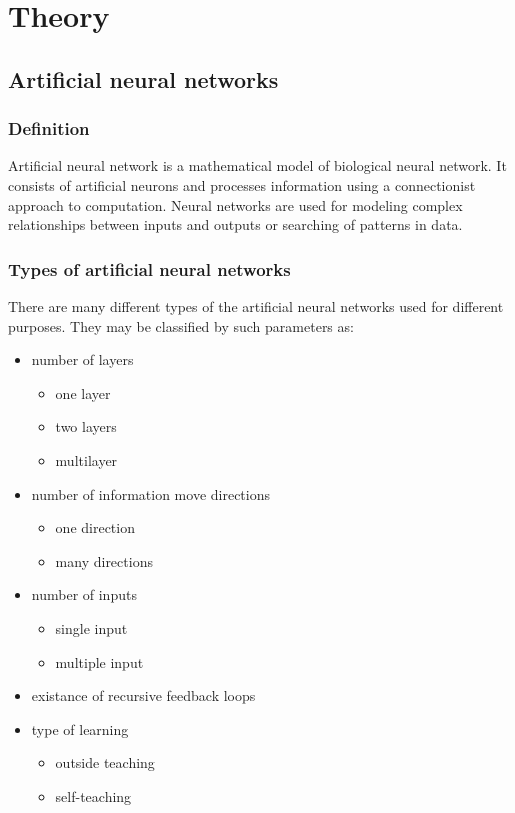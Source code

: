 \documentclass[a4paper,12pt]{article}
\begin{document}
\section{Theory}
\subsection{Artificial neural networks}
\subsubsection{Definition}

Artificial neural network is a mathematical model of biological neural network. It consists of artificial neurons and processes information using a connectionist approach to computation. Neural networks are used for modeling complex relationships between inputs and outputs or searching of patterns in data.

\subsubsection{Types of artificial neural networks}

There are many different types of the artificial neural networks used for different purposes. They may be classified by such parameters as:
\begin{itemize}
 \item number of layers
  \begin{itemize}
   \item one layer
   \item two layers
   \item multilayer
  \end{itemize}
  \item number of information move directions
  \begin{itemize}
   \item one direction
   \item many directions
  \end{itemize}
  \item number of inputs
  \begin{itemize}
   \item single input 
   \item multiple input
  \end{itemize}
  \item existance of recursive feedback loops
  \item type of learning
  \begin{itemize}
   \item outside teaching
   \item self-teaching
  \end{itemize}

\end{itemize}
\end{document}
